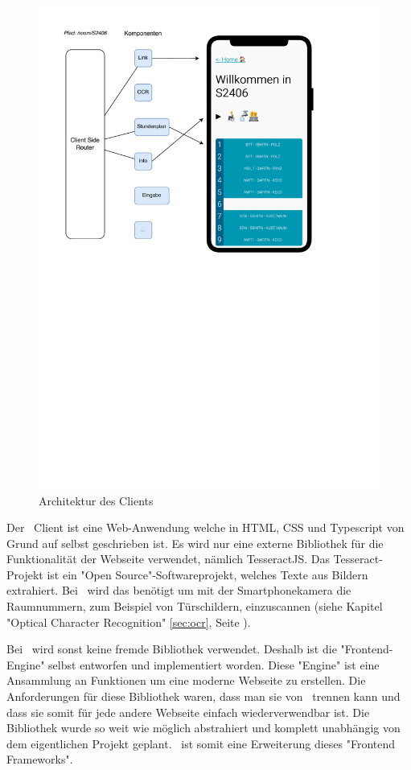 
\begin{figure}[H]
    \centering
    \includegraphics[width=120mm]{media/Intro/client_arch.svg.pdf}
    \caption{Architektur des Clients}
\end{figure}

Der \ZELIA\ Client ist eine Web-Anwendung welche in HTML, CSS und Typescript von Grund auf selbst geschrieben ist. Es wird nur eine externe Bibliothek für die Funktionalität der Webseite verwendet, nämlich TesseractJS. Das Tesseract-Projekt ist ein "Open Source"-Softwareprojekt, welches Texte aus Bildern extrahiert. Bei \ZELIA\ wird das benötigt um mit der Smartphonekamera die Raumnummern, zum Beispiel von Türschildern, einzuscannen (siehe Kapitel "Optical Character Recognition" \ref{sec:ocr}, Seite \pageref{sec:ocr}).

Bei \ZELIA\ wird sonst keine fremde Bibliothek verwendet. Deshalb ist die "Frontend-Engine" selbst entworfen und implementiert worden. Diese "Engine" ist eine Ansammlung an Funktionen um eine moderne Webseite zu erstellen. Die Anforderungen für diese Bibliothek waren, dass man sie von \ZELIA\ trennen kann und dass sie somit für jede andere Webseite einfach wiederverwendbar ist. Die Bibliothek wurde so weit wie möglich abstrahiert und komplett unabhängig von dem eigentlichen Projekt geplant. \ZELIA\ ist somit eine Erweiterung dieses "Frontend Frameworks".


